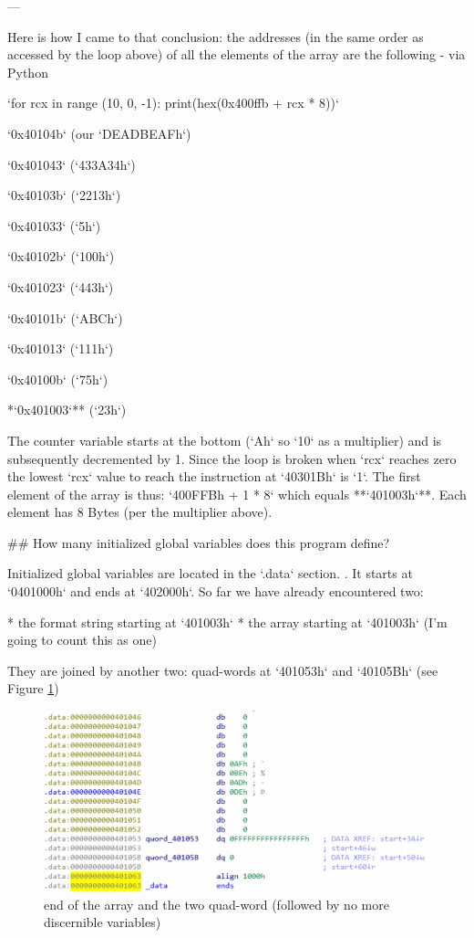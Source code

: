 \begin{markdown}

---

\noindent\s Here is how I came to that conclusion: the addresses (in the same order as accessed by the loop above) of all the elements of the array are the following -  via Python

`for rcx in range (10, 0, -1): print(hex(0x400ffb + rcx * 8))`

\begin{etaremune}
\item `0x40104b` (our `DEADBEAFh`)
\item `0x401043` (`433A34h`)
\item `0x40103b` (`2213h`)
\item `0x401033` (`5h`)
\item `0x40102b` (`100h`)
\item `0x401023` (`443h`)
\item `0x40101b` (`ABCh`)
\item `0x401013` (`111h`)
\item `0x40100b` (`75h`)
\item **`0x401003`** (`23h`)
\end{etaremune}

\noindent The counter variable starts at the bottom (`Ah` so `10` as a multiplier) and is subsequently decremented by 1. Since the loop is broken when `rcx` reaches zero the lowest `rcx` value to reach the instruction at `40301Bh` is `1`.
\n
The first element of the array is thus: `400FFBh + 1 * 8` which equals **`401003h`**. Each element has 8 Bytes (per the multiplier above).

## How many initialized global variables does this program define? 

Initialized global variables are located in the `.data` section. \cite{x64beg}. It starts at `0401000h` and ends at `402000h`.
\n
So far we have already encountered two:\s

* the format string starting at `401003h`
* the array starting at `401003h` (I'm going to count this as one)

\noindent\s They are joined by another two: quad-words at `401053h` and `40105Bh` (see Figure \ref{global})

\begin{figure}[!htbp]
\centering
\includegraphics[width=1\linewidth]{media/global.png}
\caption{end of the array and the two quad-word (followed by no more discernible variables)}\label{global}
\end{figure}


\end{markdown}
